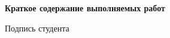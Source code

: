 \begin{center}
	\large\textbf{Краткое содержание выполняемых работ}\\
\end{center}
\begin{flushright}
	Подпись студента \underline{\hspace{3cm}}
\end{flushright}
\newpage